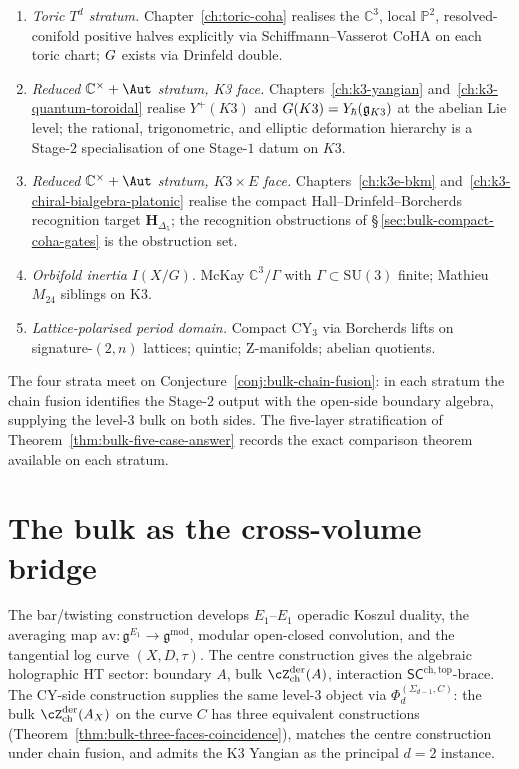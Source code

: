 \begin{enumerate}[label=\textup{(\arabic*)},leftmargin=2em,itemsep=2pt]
\item \emph{Toric $T^{d}$ stratum.} Chapter~\ref{ch:toric-coha}
realises the $\mathbb C^3$, local $\mathbb P^2$, resolved-conifold
positive halves explicitly via Schiffmann--Vasserot CoHA on each
toric chart; $G$ exists via Drinfeld double.
\item \emph{Reduced $\mathbb C^{\times} + \Aut$ stratum, K3 face.}
Chapters~\ref{ch:k3-yangian} and~\ref{ch:k3-quantum-toroidal} realise
$Y^{+}(K3)$ and $G(K3) = Y_{\hbar}(\mathfrak{g}_{K3})$ at the
abelian Lie level; the rational, trigonometric, and elliptic
deformation hierarchy is a Stage-$2$ specialisation of one
Stage-$1$ datum on $K3$.
\item \emph{Reduced $\mathbb C^{\times} + \Aut$ stratum, $K3 \times E$
face.} Chapters~\ref{ch:k3e-bkm}
and~\ref{ch:k3-chiral-bialgebra-platonic} realise the compact
Hall--Drinfeld--Borcherds recognition target
$\mathbf H_{\Delta_{5}}$; the recognition obstructions of
\S\,\ref{sec:bulk-compact-coha-gates} is the obstruction set.
\item \emph{Orbifold inertia} $I(X / G)$. McKay
$\mathbb C^{3} / \Gamma$ with $\Gamma \subset \mathrm{SU}(3)$ finite;
Mathieu $M_{24}$ siblings on K3.
\item \emph{Lattice-polarised period domain.} Compact CY$_3$ via
Borcherds lifts on signature-$(2, n)$ lattices; quintic; Z-manifolds;
abelian quotients.
\end{enumerate}

The four strata meet on Conjecture~\ref{conj:bulk-chain-fusion}: in
each stratum the chain fusion identifies the Stage-$2$ output with the
open-side boundary algebra, supplying the level-$3$ bulk on both
sides. The five-layer stratification of
Theorem~\ref{thm:bulk-five-case-answer} records the exact comparison
theorem available on each stratum.

\section{The bulk as the cross-volume bridge}
\label{sec:bulk-cross-volume}

The bar/twisting construction develops $E_{1}$--$E_{1}$ operadic
Koszul duality, the averaging map
$\mathrm{av} \colon \mathfrak g^{E_{1}} \to \mathfrak g^{\mathrm{mod}}$,
modular open-closed convolution, and the tangential log curve
$(X, D, \tau)$. The centre construction gives the algebraic
holographic HT sector: boundary $A$, bulk
$\cZ^{\mathrm{der}}_{\mathrm{ch}}(A)$, interaction
$\mathsf{SC}^{\mathrm{ch}, \mathrm{top}}$-brace. The CY-side
construction supplies the same level-$3$ object via
$\Phi^{(\Sigma_{d-1}, C)}_d$: the bulk
$\cZ^{\mathrm{der}}_{\mathrm{ch}}(A_X)$ on the curve $C$ has three
equivalent constructions (Theorem~\ref{thm:bulk-three-faces-coincidence}),
matches the centre construction under chain fusion, and admits the K3 Yangian as
the principal $d = 2$ instance.


